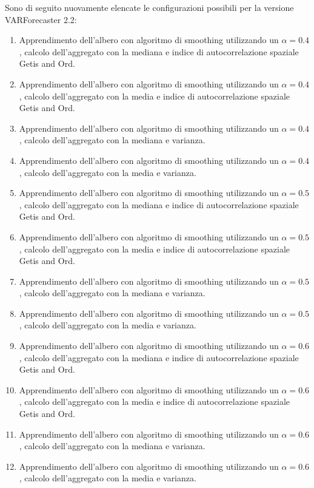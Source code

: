 \documentclass[12pt,a4paper,oneside,openright]{book}
\begin{document}
Sono di seguito nuovamente elencate le configurazioni possibili per la versione VARForecaster 2.2:
\begin{enumerate}
\item Apprendimento dell'albero con algoritmo di smoothing utilizzando un $ \alpha = 0.4$, calcolo dell'aggregato con la mediana e indice di autocorrelazione spaziale Getis and Ord.
\item Apprendimento dell'albero con algoritmo di smoothing utilizzando un $ \alpha = 0.4$, calcolo dell'aggregato con la media e indice di autocorrelazione spaziale Getis and Ord.
\item Apprendimento dell'albero con algoritmo di smoothing utilizzando un $ \alpha = 0.4$, calcolo dell'aggregato con la mediana e varianza.
\item Apprendimento dell'albero con algoritmo di smoothing utilizzando un $ \alpha = 0.4$, calcolo dell'aggregato con la media e varianza.
\item Apprendimento dell'albero con algoritmo di smoothing utilizzando un $ \alpha = 0.5$, calcolo dell'aggregato con la mediana e indice di autocorrelazione spaziale Getis and Ord.
\item Apprendimento dell'albero con algoritmo di smoothing utilizzando un $ \alpha = 0.5$, calcolo dell'aggregato con la media e indice di autocorrelazione spaziale Getis and Ord.
\item Apprendimento dell'albero con algoritmo di smoothing utilizzando un $ \alpha = 0.5$, calcolo dell'aggregato con la mediana e varianza.
\item Apprendimento dell'albero con algoritmo di smoothing utilizzando un $ \alpha = 0.5$, calcolo dell'aggregato con la media e varianza.
\item Apprendimento dell'albero con algoritmo di smoothing utilizzando un $ \alpha = 0.6$, calcolo dell'aggregato con la mediana e indice di autocorrelazione spaziale Getis and Ord.
\item Apprendimento dell'albero con algoritmo di smoothing utilizzando un $ \alpha = 0.6$, calcolo dell'aggregato con la media e indice di autocorrelazione spaziale Getis and Ord.
\item Apprendimento dell'albero con algoritmo di smoothing utilizzando un $ \alpha = 0.6$, calcolo dell'aggregato con la mediana e varianza.
\item Apprendimento dell'albero con algoritmo di smoothing utilizzando un $ \alpha = 0.6$, calcolo dell'aggregato con la media e varianza.
\end{enumerate}
\end{document}
